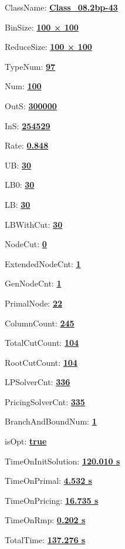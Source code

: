 \documentclass[11pt]{article}
\begin{document}
\pagestyle{empty}


ClassName: \underline{\textbf{Class_08.2bp-43}}
\par
BinSize: \underline{\textbf{100 × 100}}
\par
ReduceSize: \underline{\textbf{100 × 100}}
\par
TypeNum: \underline{\textbf{97}}
\par
Num: \underline{\textbf{100}}
\par
OutS: \underline{\textbf{300000}}
\par
InS: \underline{\textbf{254529}}
\par
Rate: \underline{\textbf{0.848}}
\par
UB: \underline{\textbf{30}}
\par
LB0: \underline{\textbf{30}}
\par
LB: \underline{\textbf{30}}
\par
LBWithCut: \underline{\textbf{30}}
\par
NodeCut: \underline{\textbf{0}}
\par
ExtendedNodeCnt: \underline{\textbf{1}}
\par
GenNodeCnt: \underline{\textbf{1}}
\par
PrimalNode: \underline{\textbf{22}}
\par
ColumnCount: \underline{\textbf{245}}
\par
TotalCutCount: \underline{\textbf{104}}
\par
RootCutCount: \underline{\textbf{104}}
\par
LPSolverCnt: \underline{\textbf{336}}
\par
PricingSolverCnt: \underline{\textbf{335}}
\par
BranchAndBoundNum: \underline{\textbf{1}}
\par
isOpt: \underline{\textbf{true}}
\par
TimeOnInitSolution: \underline{\textbf{120.010 s}}
\par
TimeOnPrimal: \underline{\textbf{4.532 s}}
\par
TimeOnPricing: \underline{\textbf{16.735 s}}
\par
TimeOnRmp: \underline{\textbf{0.202 s}}
\par
TotalTime: \underline{\textbf{137.276 s}}
\par
\newpage


\end{document}
